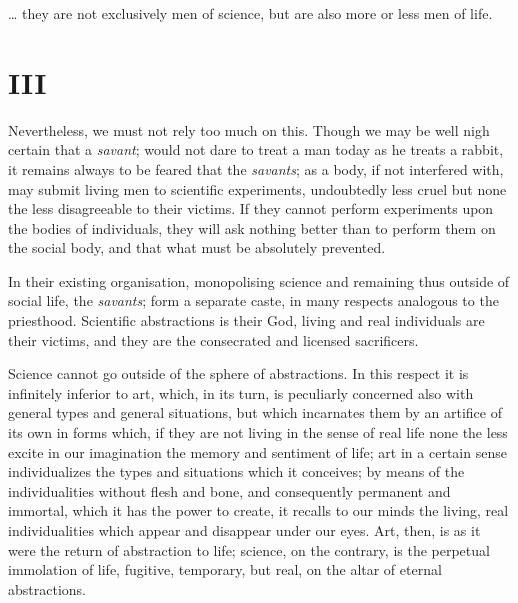 \documentclass[12pt]{report}
\newcommand{\mychapter}[2]{
\setcounter{chapter}{#1}
    \setcounter{section}{0}
    \chapter*{#2}
    \addcontentsline{toc}{chapter}{#2}
}
\begin{document}
\dots{} they are not exclusively men of science, but are also more or less men of life.

\mychapter{4}{III}


Nevertheless, we must not rely too much on this. Though we may be well nigh certain that a \emph{savant}; would not dare to treat a man today as he treats a rabbit, it remains always to be feared that the \emph{savants}; as a body, if not interfered with, may submit living men to scientific experiments, undoubtedly less cruel but none the less disagreeable to their victims. If they cannot perform experiments upon the bodies of individuals, they will ask nothing better than to perform them on the social body, and that what must be absolutely prevented.


In their existing organisation, monopolising science and remaining thus outside of social life, the \emph{savants}; form a separate caste, in many respects analogous to the priesthood. Scientific abstractions is their God, living and real individuals are their victims, and they are the consecrated and licensed sacrificers.


Science cannot go outside of the sphere of abstractions. In this respect it is infinitely inferior to art, which, in its turn, is peculiarly concerned also with general types and general situations, but which incarnates them by an artifice of its own in forms which, if they are not living in the sense of real life none the less excite in our imagination the memory and sentiment of life; art in a certain sense individualizes the types and situations which it conceives; by means of the individualities without flesh and bone, and consequently permanent and immortal, which it has the power to create, it recalls to our minds the living, real individualities which appear and disappear under our eyes. Art, then, is as it were the return of abstraction to life; science, on the contrary, is the perpetual immolation of life, fugitive, temporary, but real, on the altar of eternal abstractions.
\end{document}
